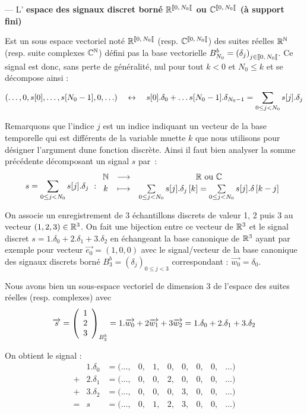 \begin{definition}
  \label{def:signal_discret_borne}
  --- L' \textbf{espace des signaux discret borné $\RNborne$ ou $\CNborne$ (à support fini)} 

  Est un sous espace vectoriel noté $\RNborne$ (resp. $\CNborne$) des
  suites réelles $\mathbb{R}^{\mathbb{N}}$ (resp. suite complexes $\mathbb{C}^{\mathbb{N}}$) défini pas la
  base vectorielle $B_{N_0}^b=\left(\delta_j\right)_{j\in\SN0}$. Ce
  signal est donc, sans perte de généralité, nul pour tout $k<0$ et
  $ N_0\leq k$ et se décompose ainsi :
  \begin{equation*}
    (\ldots,0, s[0], \dots, s[N_0-1], 0, \ldots) \quad \leftrightarrow \quad s[0].\delta_0 + \dots s[N_0-1].\delta_{N_0-1} = \sum\limits_{0\leq j< N_0}^{}{s[j].\delta_j}
  \end{equation*}

  
\end{definition}

Remarquons que l'indice $j$ est un indice indiquant un vecteur de la
base temporelle qui est différents de la variable muette $k$ que nous
utilisons pour désigner l'argument dune fonction discrète. Ainsi il
faut bien analyser la somme précédente décomposant un signal $s$ par~:
\begin{equation}
  s = \sum\limits_{0\leq j< N_0}^{}{s[j].\delta_j}~: \begin{array}{ccc} \mathbb{N} & \longrightarrow & \mathbb{R} \text{ ou } \mathbb{C} \\ k & \longmapsto & \sum\limits_{0\leq j< N_0}^{}{s[j].\delta_j\left[k\right]}={\sum\limits_{0\leq j< N_0}^{}{s[j].\delta\left[k-j\right]}} \\ \end{array}
\end{equation}

\begin{exemple}
  On associe un enregistrement de 3 échantillons discrets de valeur 1,
  2 puis 3 au vecteur $(1, 2, 3)\in\mathbb{R}^3$. On fait une bijection entre
  ce vecteur de $\mathbb{R}^3$ et le signal discret
  $s=1.\delta_0+2.\delta_1+3.\delta_2$ en échangeant la base canonique
  de $\mathbb{R}^3$ ayant par exemple pour vecteur $\vec{e_0}=(1,0,0)$ avec le
  signal/vecteur de la base canonique des signaux discrets borné
  $B_3^b=\left(\delta_j\right)_{0\leq j<3}$ correspondant :
  $\vec{w_0} = \delta_0$.

  Nous avons bien un sous-espace vectoriel de dimension 3 de l'espace
  des suites réelles (resp. complexes) avec
  $$\overrightarrow{s} = \left(\begin{array}{c} {1} \\ {2} \\ {3} \end{array}\right)_{B_3^b} = 1.\overrightarrow{w_0}+2\overrightarrow{w_1}+3\overrightarrow{w_2} = 1.\delta_0+2.\delta_1+3.\delta_2$$

   On obtient le signal :
  $$
  \begin{array}{llcccccccc}
     &1.\delta_0 & =(\ldots, &0 , &1, &0, &0, &0, &0, &\ldots)\\
    +&2.\delta_1 & =(\ldots, &0 , &0, &2, &0, &0, &0, &\ldots)\\
    +&3.\delta_2 & =(\ldots, &0 , &0, &0, &3, &0, &0, &\ldots)\\\hline
    =& s  & =(\ldots, &0 , &1, &2, &3, &0, &0, &\ldots)
  \end{array}
  $$
\end{exemple}

